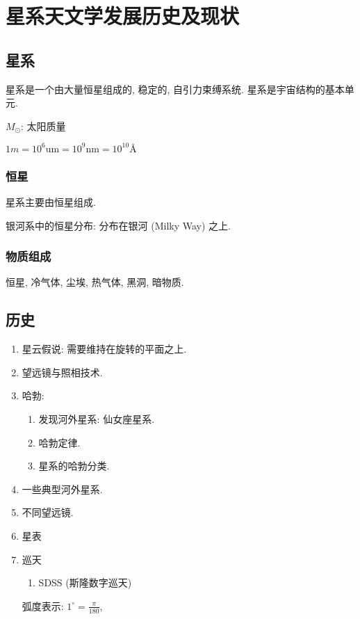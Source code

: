 \newpage

\section{星系天文学发展历史及现状}

\subsection{星系}

\begin{definition}
    星系是一个由大量恒星组成的, 稳定的, 自引力束缚系统. 星系是宇宙结构的基本单元. 
\end{definition}

$M_{\odot }$: 太阳质量

$1m=10^6 \text{um} = 10^9\text{nm}=10^{10}\text{\AA}$

\subsubsection{恒星}
星系主要由恒星组成. 

银河系中的恒星分布: 分布在银河 (Milky Way) 之上. 

\subsubsection{物质组成}
恒星, 冷气体, 尘埃, 热气体, 黑洞, 暗物质. 

\subsection{历史}
\begin{enumerate}
    \item 星云假说: 需要维持在旋转的平面之上. 
    \item 望远镜与照相技术. 
    \item 哈勃: 
    \begin{enumerate}
        \item 发现河外星系: 仙女座星系. 
        \item 哈勃定律. 
        \item 星系的哈勃分类. 
    \end{enumerate}
    \item 一些典型河外星系. 
    \item 不同望远镜.
    \item 星表
    \item 巡天
    \begin{enumerate}
        \item SDSS (斯隆数字巡天)
    \end{enumerate}

    弧度表示: $1^{\circ}=\frac{\pi}{180}$, 
\end{enumerate}